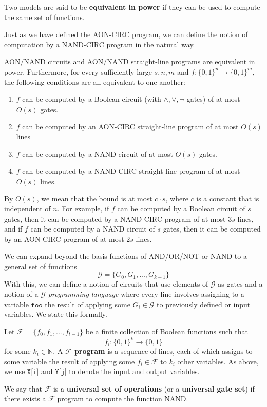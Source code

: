   \begin{definition}
    Two models are said to be \textbf{equivalent in power} if they can be used to compute the same set of functions. 
  \end{definition}

  Just as we have defined the AON-CIRC program, we can define the notion of computation by a NAND-CIRC program in the natural way. 

  \begin{theorem}
    AON/NAND circuits and AON/NAND straight-line programs are equivalent in power. Furthermore, for every sufficiently large $s, n, m$ and $f: \{0,1\}^n \longrightarrow \{0,1\}^m$, the following conditions are all equivalent to one another: 
    \begin{enumerate}
      \item $f$ can be computed by a Boolean circuit (with $\wedge, \vee, \lnot$ gates) of at most $O(s)$ gates. 
      \item $f$ can be computed by an AON-CIRC straight-line program of at most $O(s)$ lines
      \item $f$ can be computed by a NAND circuit of at most $O(s)$ gates. 
      \item $f$ can be computed by a NAND-CIRC straight-line program of at most $O(s)$ lines. 
    \end{enumerate}
    By $O(s)$, we mean that the bound is at most $c \cdot s$, where $c$ is a constant that is independent of $n$. For example, if $f$ can be computed by a Boolean circuit of $s$ gates, then it can be computed by a NAND-CIRC program of at most 3$s$ lines, and if $f$ can be computed by a NAND circuit of $s$ gates, then it can be computed by an AON-CIRC program of at most $2s$ lines. 
  \end{theorem}

  We can expand beyond the basis functions of AND/OR/NOT or NAND to a general set of functions 
  \[\mathcal{G} = \{G_0, G_1, ..., G_{k-1}\}\]
  With this, we can define a notion of circuits that use elements of $\mathcal{G}$ as gates and a notion of a \textit{$\mathcal{G}$ programming language} where every line involves assigning to a variable $\texttt{foo}$ the result of applying some $G_i \in \mathcal{G}$ to previously defined or input variables. We state this formally. 

  \begin{definition}
    Let $\mathcal{F} = \{f_0, f_1, ..., f_{t-1}\}$ be a finite collection of Boolean functions such that
    \[f_i: \{0,1\}^k \longrightarrow \{0,1\}\]
    for some $k_i \in \mathbb{N}$. A \textbf{$\mathcal{F}$ program} is a sequence of lines, each of which assigns to some variable the result of applying some $f_i \in \mathcal{F}$ to $k_i$ other variables. As above, we use $\texttt{X[i]}$ and $\texttt{Y[j]}$ to denote the input and output variables. 

    We say that $\mathcal{F}$ is a \textbf{universal set of operations} (or a \textbf{universal gate set}) if there exists a $\mathcal{F}$ program to compute the function NAND. 
  \end{definition}

